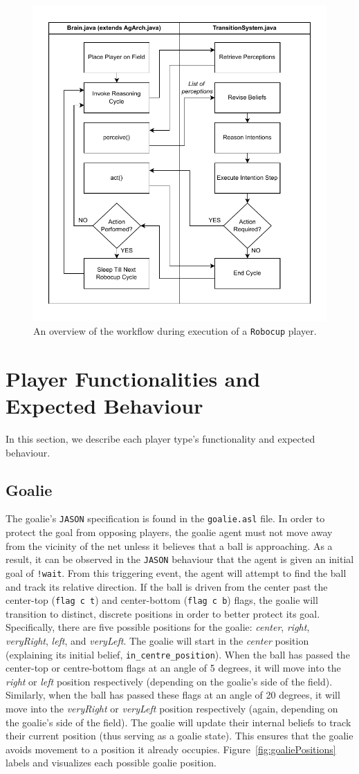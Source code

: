 \documentclass[conference]{IEEEtran}
\begin{document}
   

\begin{figure}[ht!]
    \centering\centerline{\includegraphics[width=.35\textwidth]{Figures/ExecutionWorkflow.pdf}}
    \caption{An overview of the workflow during execution of a \texttt{Robocup} player.}
    \label{fig:robocupExecution}
\end{figure}
 





\section{Player Functionalities and Expected Behaviour}
In this section, we describe each player type's functionality and expected behaviour. 

\subsection{Goalie}\label{AA}
The goalie's \texttt{JASON} specification is found in the \texttt{goalie.asl} file. In order to protect the goal from opposing players, the goalie agent must not move away from the vicinity of the net unless it believes that a ball is approaching. As a result, it can be observed in the \texttt{JASON} behaviour that the agent is given an initial goal of \texttt{!wait}. From this triggering event, the agent will attempt to find the ball and track its relative direction. If the ball is driven from the center past the center-top (\texttt{flag c t}) and center-bottom (\texttt{flag c b}) flags, the goalie will transition to distinct, discrete positions in order to better protect its goal. Specifically, there are five possible positions for the goalie: \textit{center}, \textit{right}, \textit{veryRight}, \textit{left}, and \textit{veryLeft}. The goalie will start in the \textit{center} position (explaining its initial belief, \texttt{in\_centre\_position}). When the ball has passed the center-top or centre-bottom flags at an angle of 5 degrees, it will move into the \textit{right} or \textit{left} position respectively (depending on the goalie's side of the field). Similarly, when the ball has passed these flags at an angle of 20 degrees,   it will move into the \textit{veryRight} or \textit{veryLeft} position respectively (again, depending on the goalie's side of the field). The goalie will update their internal beliefs to track their current position (thus serving as a goalie state). This ensures that the goalie avoids movement to a position it already occupies. Figure~\ref{fig:goaliePositions} labels and visualizes each possible goalie position. 
\end{document}
